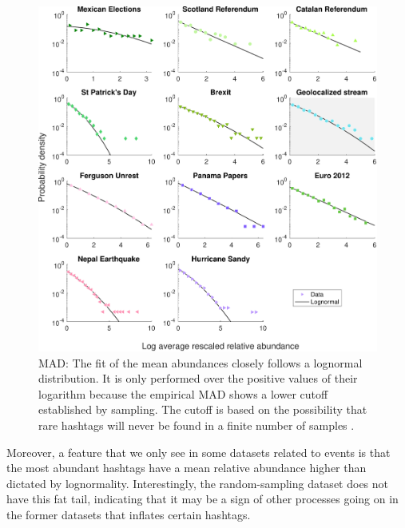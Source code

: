  \begin{figure}[ht!]
    \centering
    \includegraphics[width=\textwidth]{figures/chp4/MAD_tweet_RemSam.pdf}
   \caption[MAD]{MAD: The fit of the mean abundances closely follows a lognormal distribution. It is only performed over the positive values of their logarithm because the empirical MAD shows a lower cutoff established by sampling. The cutoff is based on the possibility that rare hashtags will never be found in a finite number of samples \cite{grilli2020macroecological}.}
    \label{fig:4:MAD}
\end{figure}

Moreover, a feature that we only see in some datasets related to events is that the most abundant hashtags have a mean relative abundance higher than dictated by lognormality.  Interestingly, the random-sampling dataset does not have this fat tail, indicating that it may be a sign of other processes going on in the former datasets that inflates certain hashtags.\\

